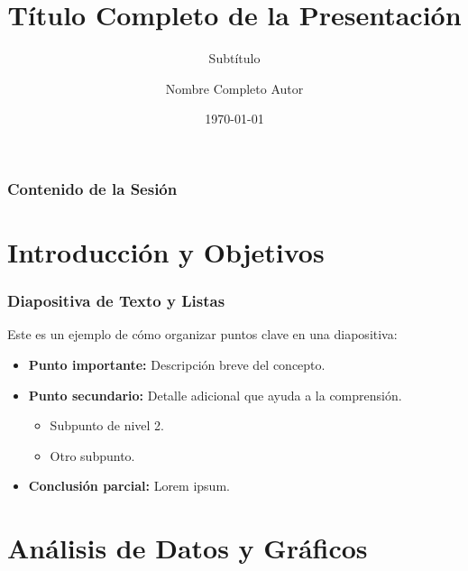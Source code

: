 \documentclass[aspectratio=169]{beamer} %
\title[Título Corto]{Título Completo de la Presentación}
\subtitle{Subtítulo}
\author[Nombre Corto]{Nombre Completo Autor}
\institute[COMPUTAEX]{Fundación COMPUTAEX}
\date{\today}
\begin{document}
{
\begin{frame}
\titlepage
\end{frame}
}

\desactivarfondo
\begin{frame}
\frametitle{Contenido de la Sesión}
\tableofcontents %
\end{frame}


\section{Introducción y Objetivos}

\activarlogoradiante{}
\begin{frame}
\frametitle{Diapositiva de Texto y Listas}
Este es un ejemplo de cómo organizar puntos clave en una diapositiva:
\begin{itemize}
    \item \textbf{Punto importante:} Descripción breve del concepto.
    \item \textbf{Punto secundario:} Detalle adicional que ayuda a la comprensión.
    \begin{itemize}
        \item Subpunto de nivel 2.
        \item Otro subpunto.
    \end{itemize}
    \item \textbf{Conclusión parcial:} Lorem ipsum.
\end{itemize}
\end{frame}
\desactivarlogoradiante{}
\section{Análisis de Datos y Gráficos}
\end{document}
